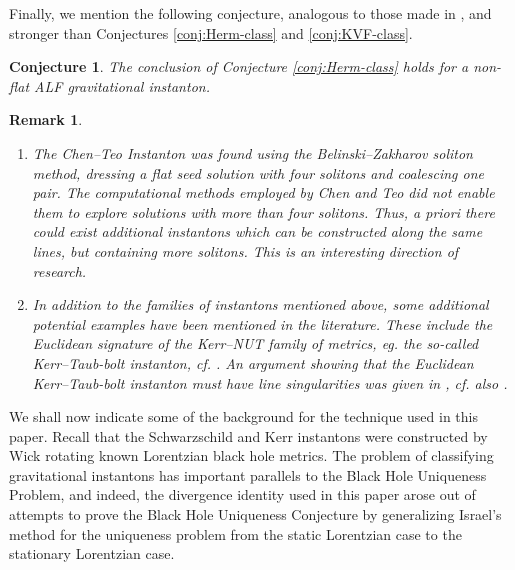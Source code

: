 \documentclass[a4paper,11pt,reqno]{amsart}
\theoremstyle{plain}
\newtheorem{conj}{Conjecture}
\newtheorem{remark}[thm]{Remark}
\numberwithin{equation}{section}
\begin{document}
Finally, we mention the following conjecture, analogous to those made in \cite{gibbons:1978:survey}, and stronger than Conjectures \ref{conj:Herm-class} and \ref{conj:KVF-class}. 
\begin{conj} \label{conj:strong-class} The conclusion of Conjecture \ref{conj:Herm-class} holds for a non-flat ALF gravitational instanton. 
\end{conj} 

\begin{remark} 
\begin{enumerate}
\item  
The Chen--Teo Instanton was found using the Belinski--Zakha\-rov soliton method, dressing a flat seed solution with four solitons and coalescing one pair. The computational methods employed by Chen and Teo did not enable them to explore solutions with more than four solitons. Thus, a priori there could exist additional instantons which can be constructed along the same lines, but containing more solitons. This  is an interesting direction of research. 
\item
In addition to the families of instantons mentioned above, some additional potential examples have been mentioned in the literature. These include the Euclidean signature of the Kerr--NUT family of metrics, eg. the so-called Kerr--Taub-bolt instanton, cf. \cite[\S III]{gibbons:perry:1980}. An argument showing that the Euclidean Kerr--Taub-bolt  instanton
%
must have line singularities was given in \cite[\S 4.8] {2010NuPhB.838..207C}, cf. also  \cite[Appendix A]{clement2020smarr}.
\end{enumerate} 
\end{remark} 

We shall now indicate some of the background for the technique used in this paper. Recall that the Schwarzschild and Kerr instantons were constructed by Wick rotating known Lorentzian black hole metrics. The problem of classifying gravitational instantons has important parallels to the Black Hole Uniqueness Problem, and indeed, the divergence identity used in this paper arose out of attempts to prove the Black Hole Uniqueness Conjecture by  generalizing Israel's method \cite{1967PhRv..164.1776I,MR398432,1977GReGr...8..695R} for the uniqueness problem from the static Lorentzian case to the stationary Lorentzian case. 
\end{document}
